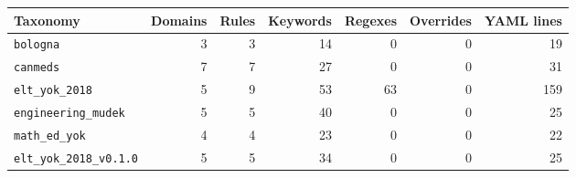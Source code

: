 \begin{tabular}{@{}lrrrrrr@{}}
\toprule
Taxonomy & Domains & Rules & Keywords & Regexes & Overrides & YAML lines \\
\midrule
\texttt{bologna} & 3 & 3 & 14 & 0 & 0 & 19 \\
\texttt{canmeds} & 7 & 7 & 27 & 0 & 0 & 31 \\
\texttt{elt\_yok\_2018} & 5 & 9 & 53 & 63 & 0 & 159 \\
\texttt{engineering\_mudek} & 5 & 5 & 40 & 0 & 0 & 25 \\
\texttt{math\_ed\_yok} & 4 & 4 & 23 & 0 & 0 & 22 \\
\texttt{elt\_yok\_2018\_v0.1.0} & 5 & 5 & 34 & 0 & 0 & 25 \\
\bottomrule
\end{tabular}
